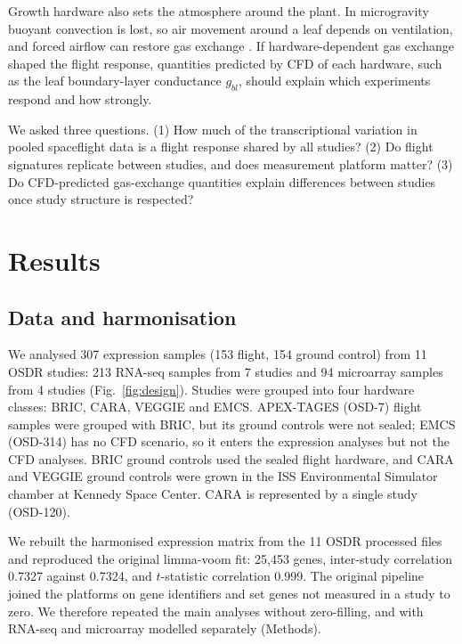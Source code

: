 \documentclass[11pt,a4paper]{article}
\begin{document}
Growth hardware also sets the atmosphere around the plant. In microgravity buoyant convection is lost, so air movement around a leaf depends on ventilation, and forced airflow can restore gas exchange \citep{kitaya2003,monje2005}. If hardware-dependent gas exchange shaped the flight response, quantities predicted by CFD of each hardware, such as the leaf boundary-layer conductance $g_{bl}$, should explain which experiments respond and how strongly.

We asked three questions. (1) How much of the transcriptional variation in pooled spaceflight data is a flight response shared by all studies? (2) Do flight signatures replicate between studies, and does measurement platform matter? (3) Do CFD-predicted gas-exchange quantities explain differences between studies once study structure is respected?

\section*{Results}

\subsection*{Data and harmonisation}

We analysed 307 expression samples (153 flight, 154 ground control) from 11 OSDR studies: 213 RNA-seq samples from 7 studies and 94 microarray samples from 4 studies (Fig.~\ref{fig:design}). Studies were grouped into four hardware classes: BRIC, CARA, VEGGIE and EMCS. APEX-TAGES (OSD-7) flight samples were grouped with BRIC, but its ground controls were not sealed; EMCS (OSD-314) has no CFD scenario, so it enters the expression analyses but not the CFD analyses. BRIC ground controls used the sealed flight hardware, and CARA and VEGGIE ground controls were grown in the ISS Environmental Simulator chamber at Kennedy Space Center. CARA is represented by a single study (OSD-120).

We rebuilt the harmonised expression matrix from the 11 OSDR processed files and reproduced the original limma-voom fit: 25,453 genes, inter-study correlation 0.7327 against 0.7324, and $t$-statistic correlation 0.999. The original pipeline joined the platforms on gene identifiers and set genes not measured in a study to zero. We therefore repeated the main analyses without zero-filling, and with RNA-seq and microarray modelled separately (Methods).
\end{document}
